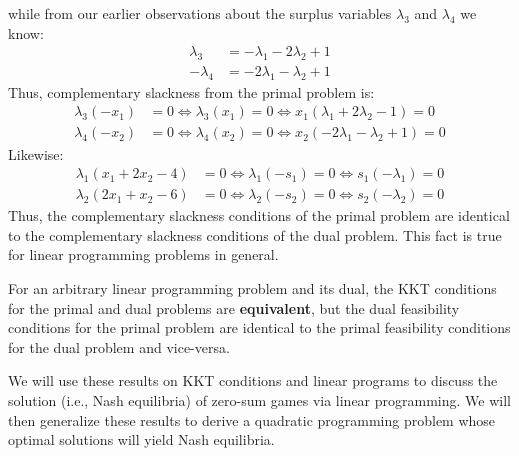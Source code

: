 while from our earlier observations about the surplus variables $\lambda_3$ and $\lambda_4$ we know:
\begin{equation}
    \begin{aligned}
        \lambda_3 &= -\lambda_1 - 2\lambda_2 + 1\\
    -\lambda_4 &= -2\lambda_1 - \lambda_2 + 1
    \end{aligned}
\end{equation}
Thus, complementary slackness from the primal problem is:
\begin{equation}
\begin{aligned}
    \lambda_3(-x_1) &= 0 \iff \lambda_3(x_1) =0  \iff 
	x_1(\lambda_1 + 2\lambda_2 - 1) = 0\\
\lambda_4(-x_2) &= 0 \iff \lambda_4(x_2) =0 \iff x_2(-2\lambda_1 - \lambda_2 + 1) = 0
\end{aligned}
\end{equation}
Likewise:
\begin{equation}
    \begin{aligned}
        \lambda_1(x_1 + 2x_2 - 4) &=0 \iff \lambda_1(-s_1) = 0 \iff s_1(-\lambda_1) = 0\\
\lambda_2(2x_1 + x_2 - 6) &=0 \iff \lambda_2(-s_2) = 0 \iff s_2(-\lambda_2) = 0
    \end{aligned}
\end{equation}
Thus, the complementary slackness conditions of the primal problem are identical to the complementary slackness conditions of the dual problem. This fact is true for linear programming problems in general.

\begin{remark} For an arbitrary linear programming problem and its dual, the KKT conditions for the primal and dual problems are \textbf{equivalent}, but the dual feasibility conditions for the primal problem are identical to the primal feasibility conditions for the dual problem and vice-versa. 
\end{remark}

\begin{remark} We will use these results on KKT conditions and linear programs to discuss the solution (i.e., Nash equilibria) of zero-sum games via linear programming. We will then generalize these results to derive a quadratic programming problem whose optimal solutions will yield Nash equilibria. 
\end{remark}

